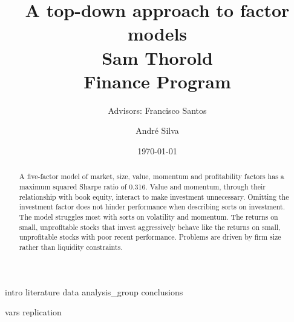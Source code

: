 \documentclass[a4paper, 12pt]{article}
\title{
  {A top-down approach to factor models}\\[1cm]
  {\Large Sam Thorold}\\%
  {\large Finance Program}\\
}
\author[1]{Advisors: Francisco Santos}
\affil[1]{Norwegian School of Economics}
\author[2]{Andr\'e Silva}
\affil[2]{NOVA School of Business and Economics}
\date{\today}
\begin{document}
\maketitle

\begin{abstract}
  A five-factor model of
  market, size, value, momentum and profitability factors
  has a maximum squared Sharpe ratio of 0.316.
  Value and momentum, through their relationship with book equity,
  interact to make investment unnecessary.
  Omitting the investment factor does not hinder performance when describing
  sorts on investment.
  The model struggles most with sorts on volatility and momentum.
  The returns on small, unprofitable stocks that invest aggressively behave
  like the returns on small, unprofitable stocks with poor recent performance.
  Problems are driven by firm size rather than liquidity constraints.
\end{abstract}

\pagebreak


{intro}
{literature}
{data}
{analysis_group}
{conclusions}


\printbibliography

\appendix
{vars}
{replication}
\end{document}
